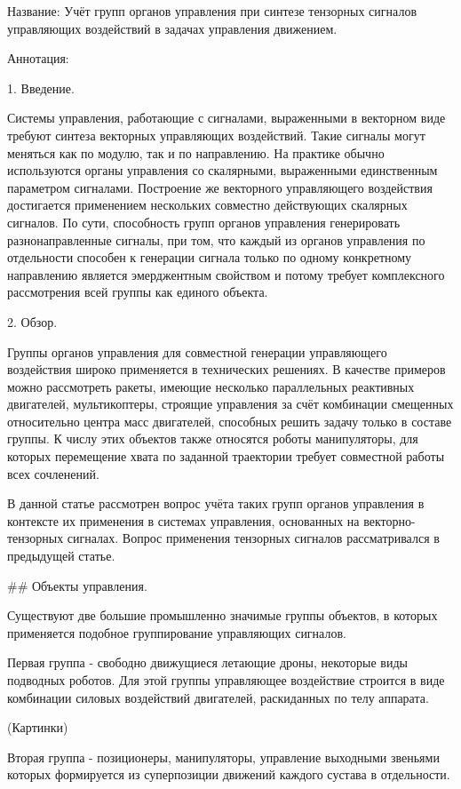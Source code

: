 
Название:
Учёт групп органов управления при синтезе тензорных сигналов управляющих воздействий в задачах управления движением.

Аннотация:


1. Введение.

Системы управления, работающие с сигналами, выраженными в векторном виде требуют синтеза векторных управляющих воздействий. Такие сигналы могут меняться как по модулю, так и по направлению. На практике обычно используются органы управления со скалярными, выраженными единственным параметром сигналами. Построение же векторного управляющего воздействия достигается применением нескольких совместно действующих скалярных сигналов. По сути, способность групп органов управления генерировать разнонаправленные сигналы, при том, что каждый из органов управления по отдельности способен к генерации сигнала только по одному конкретному направлению является эмерджентным свойством и потому требует комплексного рассмотрения всей группы как единого объекта.

2. Обзор.

Группы органов управления для совместной генерации управляющего воздействия широко применяется в технических решениях. В качестве примеров можно рассмотреть ракеты, имеющие несколько параллельных реактивных двигателей, мультикоптеры, строящие управления за счёт комбинации смещенных относительно центра масс двигателей, способных решить задачу только в составе группы. К числу этих объектов также относятся роботы манипуляторы, для которых перемещение хвата по заданной траектории требует совместной работы всех сочленений.

В данной статье рассмотрен вопрос учёта таких групп органов управления в контексте их применения в системах управления, основанных на векторно-тензорных сигналах. Вопрос применения тензорных сигналов рассматривался в предыдущей статье.

## Объекты управления.

Существуют две большие промышленно значимые группы объектов, в которых применяется подобное группирование управляющих сигналов.

Первая группа - свободно движущиеся летающие дроны, некоторые виды подводных роботов. Для этой группы управляющее воздействие строится в виде комбинации силовых воздействий двигателей, раскиданных по телу аппарата.

(Картинки)

Вторая группа - позиционеры, манипуляторы, управление выходными звеньями которых формируется из суперпозиции движений каждого сустава в отдельности.

